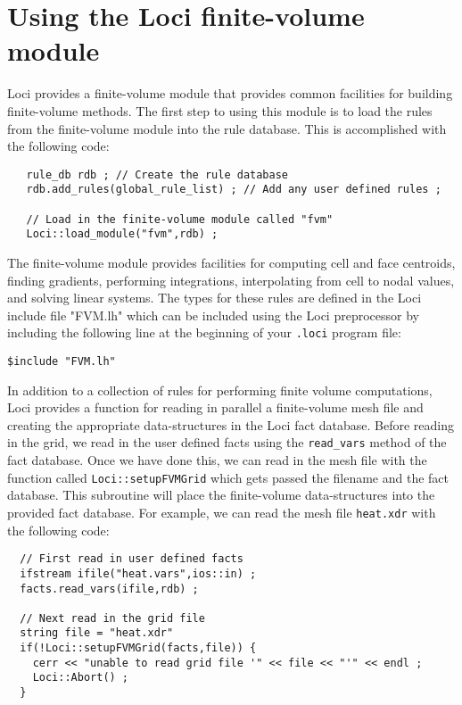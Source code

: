 \documentclass[10pt,epsf]{book}
\begin{document}
\section{Using the Loci finite-volume module}

Loci provides a finite-volume module that provides common facilities
for building finite-volume methods.  The first step to using this
module is to load the rules from the finite-volume module into the
rule database.  This is accomplished with the following code:
\begin{verbatim}
   rule_db rdb ; // Create the rule database
   rdb.add_rules(global_rule_list) ; // Add any user defined rules ;

   // Load in the finite-volume module called "fvm"
   Loci::load_module("fvm",rdb) ;
\end{verbatim}

The finite-volume module provides facilities for computing cell and
face centroids, finding gradients, performing integrations,
interpolating from cell to nodal values, and solving linear systems.
The types for these rules are defined in the Loci include file
"FVM.lh" which can be included using the Loci preprocessor by
including the following line at the beginning of your {\tt .loci}
program file:
\begin{verbatim}
$include "FVM.lh"
\end{verbatim}

In addition to a collection of rules for performing finite volume
computations, Loci provides a function for reading in parallel a
finite-volume mesh file and creating the appropriate data-structures
in the Loci fact database.  Before reading in the grid, we read in the
user defined facts using the {\tt read\_vars} method of the fact
database. Once we have done this, we can read in the mesh file with
the function called {\tt Loci::setupFVMGrid} which gets passed the
filename and the fact database.  This subroutine will place the
finite-volume data-structures into the provided fact database.  For
example, we can read the mesh file {\tt heat.xdr} with the following
code:
\begin{verbatim}
  // First read in user defined facts
  ifstream ifile("heat.vars",ios::in) ;
  facts.read_vars(ifile,rdb) ;

  // Next read in the grid file
  string file = "heat.xdr"
  if(!Loci::setupFVMGrid(facts,file)) {
    cerr << "unable to read grid file '" << file << "'" << endl ;
    Loci::Abort() ;
  }
\end{verbatim}
\end{document}
